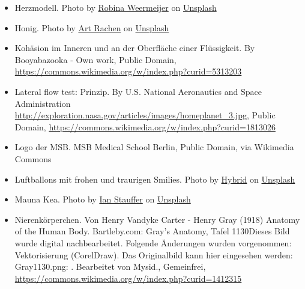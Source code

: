 \documentclass{beamer}
\begin{document}
\begin{frame}
\begin{tiny}
\begin{itemize}
\item
Herzmodell. Photo by \href{https://unsplash.com/@averey?utm_source=unsplash&utm_medium=referral&utm_content=creditCopyText}{Robina Weermeijer} on \href{https://unsplash.com/s/photos/heart?utm_source=unsplash&utm_medium=referral&utm_content=creditCopyText}{Unsplash}

\item
Honig. Photo by \href{https://unsplash.com/@artrachen?utm_source=unsplash&utm_medium=referral&utm_content=creditCopyText}{Art Rachen} on \href{https://unsplash.com/s/photos/honey?utm_source=unsplash&utm_medium=referral&utm_content=creditCopyText}{Unsplash}
    

\item
Kohäsion im Inneren und an der Oberfläche einer Flüssigkeit. By Booyabazooka - Own work, Public Domain, \url{https://commons.wikimedia.org/w/index.php?curid=5313203}

\item
Lateral flow test: Prinzip. By U.S. National Aeronautics and Space Administration \url{http://exploration.nasa.gov/articles/images/homeplanet_3.jpg}, Public Domain, \url{https://commons.wikimedia.org/w/index.php?curid=1813026}

 
\item
Logo der MSB. MSB Medical School Berlin, Public Domain, via Wikimedia Commons


\item
Luftballons mit frohen und traurigen Smilies. Photo by \href{https://unsplash.com/@artbyhybrid?utm_source=unsplash&utm_medium=referral&utm_content=creditCopyText}{Hybrid} on \href{https://unsplash.com/s/photos/feedback?utm_source=unsplash&utm_medium=referral&utm_content=creditCopyText}{Unsplash}


\item
Mauna Kea. Photo by \href{https://unsplash.com/@ianstauffer?utm_source=unsplash&utm_medium=referral&utm_content=creditCopyText}{Ian Stauffer} on \href{https://unsplash.com/s/photos/mauna-kea?utm_source=unsplash&utm_medium=referral&utm_content=creditCopyText}{Unsplash}

\item
Nierenkörperchen. Von Henry Vandyke Carter - Henry Gray (1918) Anatomy of the Human Body. Bartleby.com: Gray's Anatomy, Tafel 1130Dieses Bild wurde digital nachbearbeitet. Folgende Änderungen wurden vorgenommen: Vektorisierung (CorelDraw). Das Originalbild kann hier eingesehen werden: Gray1130.png: . Bearbeitet von Mysid., Gemeinfrei, \url{https://commons.wikimedia.org/w/index.php?curid=1412315}


\end{itemize}
\end{tiny}
\end{frame}
\end{document}
